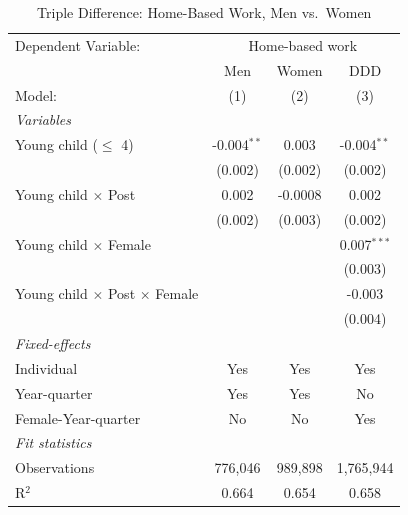 
\begin{table}[H]
   \caption{\label{tab:triple_diff} Triple Difference: Home-Based Work, Men vs.\ Women}
   \centering
\small\setlength{\tabcolsep}{5pt}
   \begin{tabular}{lccc}
      \toprule
      Dependent Variable: & \multicolumn{3}{c}{Home-based work}\\
                                                  & Men           & Women   & DDD \\   
      Model:                                      & (1)           & (2)     & (3)\\  
      \midrule
      \emph{Variables}\\
      Young child ($\leq$ 4)                      & -0.004$^{**}$ & 0.003   & -0.004$^{**}$\\   
                                                  & (0.002)       & (0.002) & (0.002)\\   
\addlinespace[2pt]
      Young child $\times$ Post                   & 0.002         & -0.0008 & 0.002\\   
                                                  & (0.002)       & (0.003) & (0.002)\\   
\addlinespace[2pt]
      Young child $\times$ Female                 &               &         & 0.007$^{***}$\\   
                                                  &               &         & (0.003)\\   
\addlinespace[2pt]
      Young child $\times$ Post $\times$ Female   &               &         & -0.003\\   
                                                  &               &         & (0.004)\\   
\addlinespace[2pt]
      \midrule
      \emph{Fixed-effects}\\
      Individual                                  & Yes           & Yes     & Yes\\  
      Year-quarter & Yes & Yes & No\\
      Female-Year-quarter & No & No & Yes\\
      \midrule
      \emph{Fit statistics}\\
      Observations                                & 776,046       & 989,898 & 1,765,944\\  
      R$^2$                                       & 0.664         & 0.654   & 0.658\\  
\bottomrule
   \end{tabular}
   

\end{table}
